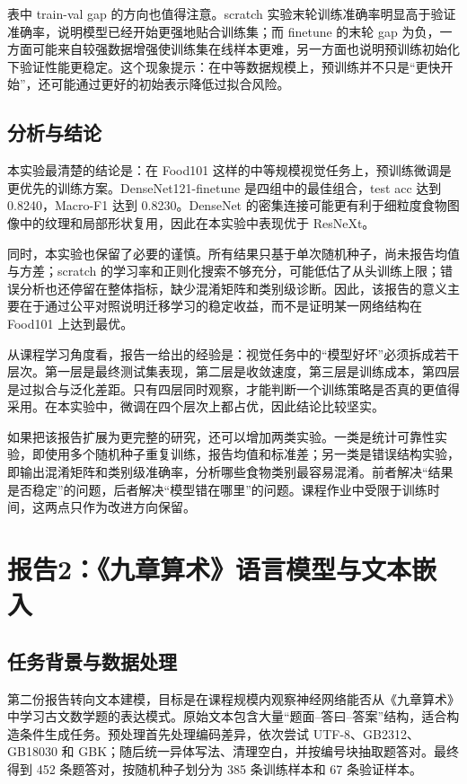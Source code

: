 \documentclass[a4paper,11pt,twocolumn]{article}
\begin{document}
表中 train-val gap 的方向也值得注意。scratch 实验末轮训练准确率明显高于验证准确率，说明模型已经开始更强地贴合训练集；而 finetune 的末轮 gap 为负，一方面可能来自较强数据增强使训练集在线样本更难，另一方面也说明预训练初始化下验证性能更稳定。这个现象提示：在中等数据规模上，预训练并不只是“更快开始”，还可能通过更好的初始表示降低过拟合风险。

\subsection{分析与结论}

本实验最清楚的结论是：在 Food101 这样的中等规模视觉任务上，预训练微调是更优先的训练方案。DenseNet121-finetune 是四组中的最佳组合，test acc 达到 0.8240，Macro-F1 达到 0.8230。DenseNet 的密集连接可能更有利于细粒度食物图像中的纹理和局部形状复用，因此在本实验中表现优于 ResNeXt。

同时，本实验也保留了必要的谨慎。所有结果只基于单次随机种子，尚未报告均值与方差；scratch 的学习率和正则化搜索不够充分，可能低估了从头训练上限；错误分析也还停留在整体指标，缺少混淆矩阵和类别级诊断。因此，该报告的意义主要在于通过公平对照说明迁移学习的稳定收益，而不是证明某一网络结构在 Food101 上达到最优。

从课程学习角度看，报告一给出的经验是：视觉任务中的“模型好坏”必须拆成若干层次。第一层是最终测试集表现，第二层是收敛速度，第三层是训练成本，第四层是过拟合与泛化差距。只有四层同时观察，才能判断一个训练策略是否真的更值得采用。在本实验中，微调在四个层次上都占优，因此结论比较坚实。

如果把该报告扩展为更完整的研究，还可以增加两类实验。一类是统计可靠性实验，即使用多个随机种子重复训练，报告均值和标准差；另一类是错误结构实验，即输出混淆矩阵和类别级准确率，分析哪些食物类别最容易混淆。前者解决“结果是否稳定”的问题，后者解决“模型错在哪里”的问题。课程作业中受限于训练时间，这两点只作为改进方向保留。

\section{报告2：《九章算术》语言模型与文本嵌入}

\subsection{任务背景与数据处理}

第二份报告转向文本建模，目标是在课程规模内观察神经网络能否从《九章算术》中学习古文数学题的表达模式。原始文本包含大量“题面--答曰--答案”结构，适合构造条件生成任务。预处理首先处理编码差异，依次尝试 UTF-8、GB2312、GB18030 和 GBK；随后统一异体写法、清理空白，并按编号块抽取题答对。最终得到 452 条题答对，按随机种子划分为 385 条训练样本和 67 条验证样本。
\end{document}
